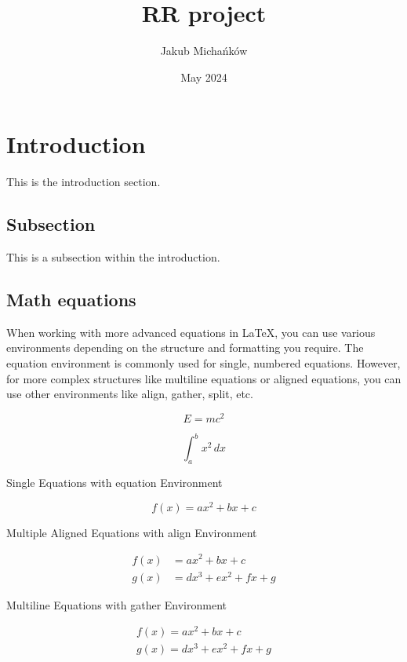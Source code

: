 \documentclass{article}
\title{RR project}
\author{Jakub Michańków}
\date{May 2024}
\begin{document}
\maketitle

\section{Introduction}

This is the introduction section.

\subsection{Subsection}

This is a subsection within the introduction.

\subsection{Math equations}

When working with more advanced equations in LaTeX, you can use various environments depending on the structure and formatting you require. The equation environment is commonly used for single, numbered equations. However, for more complex structures like multiline equations or aligned equations, you can use other environments like align, gather, split, etc.

\[
E = mc^2
\]

\[ %
\int_{a}^{b} x^2 \, dx
\]

Single Equations with equation Environment

\begin{equation}
    f(x) = ax^2 + bx + c
\end{equation}

\vspace{20pt}

Multiple Aligned Equations with align Environment

\begin{align}
    f(x) &= ax^2 + bx + c \\
    g(x) &= dx^3 + ex^2 + fx + g
\end{align}

Multiline Equations with gather Environment

\begin{gather}
    f(x) = ax^2 + bx + c \\
    g(x) = dx^3 + ex^2 + fx + g
\end{gather}
\end{document}
